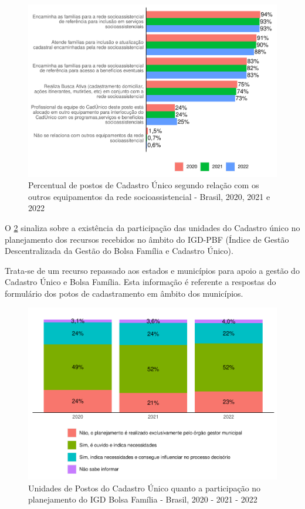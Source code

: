 \documentclass[
  brazilian]{report}
\begin{document}
\begin{figure}
\includegraphics{Censo-SUAS-2022_files/figure-latex/redesuas-1} \caption[Percentual de postos de Cadastro Único segundo relação com os outros equipamentos da rede socioassistencial - Brasil, 2020, 2021 e 2022]{Percentual de postos de Cadastro Único segundo relação com os outros equipamentos da rede socioassistencial - Brasil, 2020, 2021 e 2022}\label{fig:redesuas}
\end{figure}

O \cref{fig:igdbolsa} sinaliza sobre a existência da participação das
unidades do Cadastro único no planejamento dos recursos recebidos no
âmbito do IGD-PBF (Índice de Gestão Descentralizada da Gestão do Bolsa
Família e Cadastro Único).

Trata-se de um recurso repassado aos estados e municípios para apoio a
gestão do Cadastro Único e Bolsa Família. Esta informação é referente a
respostas do formulário dos potos de cadastramento em âmbito dos
municípios.

\begin{figure}
\includegraphics{Censo-SUAS-2022_files/figure-latex/igdbolsa-1} \caption[Unidades de Postos do Cadastro Único quanto a participação no planejamento do IGD Bolsa Família - Brasil, 2020 - 2021 - 2022]{Unidades de Postos do Cadastro Único quanto a participação no planejamento do IGD Bolsa Família - Brasil, 2020 - 2021 - 2022}\label{fig:igdbolsa}
\end{figure}
\end{document}
